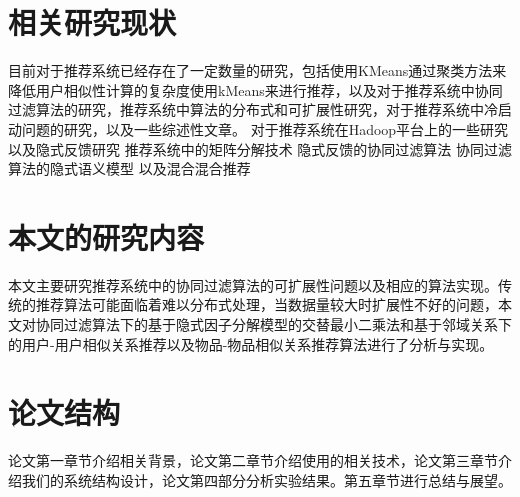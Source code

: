 \section{相关研究现状}
目前对于推荐系统已经存在了一定数量的研究，包括使用KMeans通过聚类方法来降低用户相似性计算的复杂度使用kMeans来进行推荐\cite{Zahra:2015ja}\cite{Kularbphettong:2014vm}\cite{Dakhel:2011dt}，以及对于推荐系统中协同过滤算法的研究\cite{Shi:2014fj}\cite{Su:2009cl}，推荐系统中算法的分布式和可扩展性研究\cite{Cacheda:2011bh}\cite{Narang:2011iq}\cite{Schelter:2012jg}，对于推荐系统中冷启动问题的研究\cite{Liu:2014hc}，以及一些综述性文章。\cite{Portugal:2015vy}
对于推荐系统在Hadoop平台上的一些研究\cite{Zhao:2010ha}\cite{Jiang:2011bp}
以及隐式反馈研究\cite{Hu:2008el}
推荐系统中的矩阵分解技术\cite{Koren:2009jg}
隐式反馈的协同过滤算法
协同过滤算法的隐式语义模型\cite{hofmann2004latent} %
以及混合混合推荐\cite{Burke:2002fy}

\section{本文的研究内容}
本文主要研究推荐系统中的协同过滤算法的可扩展性问题以及相应的算法实现。传统的推荐算法可能面临着难以分布式处理，当数据量较大时扩展性不好的问题，本文对协同过滤算法下的基于隐式因子分解模型的交替最小二乘法和基于邻域关系下的用户-用户相似关系推荐以及物品-物品相似关系推荐算法进行了分析与实现。
\section{论文结构}
论文第一章节介绍相关背景，论文第二章节介绍使用的相关技术，论文第三章节介绍我们的系统结构设计，论文第四部分分析实验结果。第五章节进行总结与展望。
